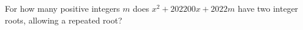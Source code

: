 For how many positive integers $ m $ does $ x^2+202200x+2022m $ have two integer roots, allowing a repeated root?
